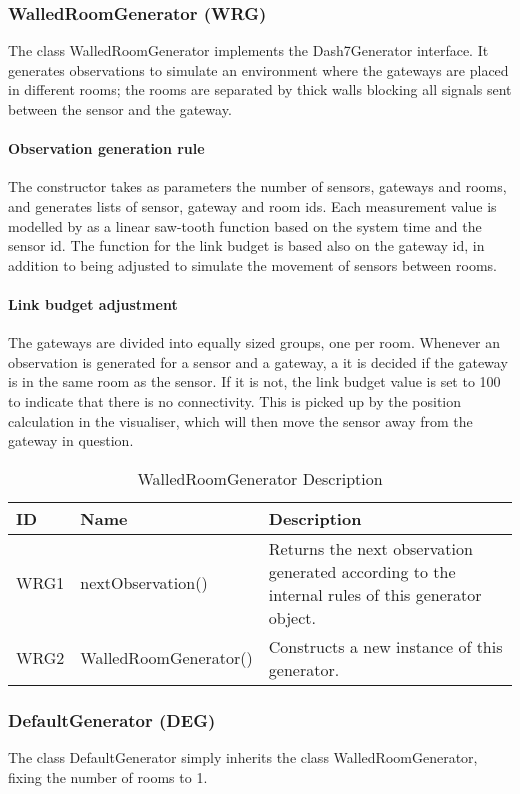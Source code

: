 \documentclass[../document]{subfiles}
\begin{document}
\subsubsection{WalledRoomGenerator (WRG)}
The class WalledRoomGenerator implements the Dash7Generator interface. It generates observations to simulate an environment where the gateways are placed in different rooms; the rooms are separated by thick walls blocking all signals sent between the sensor and the gateway.

\paragraph{Observation generation rule}
The constructor takes as parameters the number of sensors, gateways and rooms, and generates lists of sensor, gateway and room ids. Each measurement value is modelled by as a linear saw-tooth function based on the system time and the sensor id. The function for the link budget is based also on the gateway id, in addition to being adjusted to simulate the movement of sensors between rooms.

\paragraph{Link budget adjustment}
The gateways are divided into equally sized groups, one per room. Whenever an observation is generated for a sensor and a gateway, a it is decided if the gateway is in the same room as the sensor. If it is not, the link budget value is set to 100 to indicate that there is no connectivity. This is picked up by the position calculation in the visualiser, which will then move the sensor away from the gateway in question.

\begin{table}[H]
\caption{WalledRoomGenerator Description}
\centering
\begin{tabularx}{\textwidth}{|L{1.2cm}|L{4cm}|X|}
\hline ID
&Name
&Description
\\ \hline 
WRG1
&nextObservation()
&Returns the next observation generated according to the internal rules of this generator object.
\\ \hline WRG2
&WalledRoomGenerator()
&Constructs a new instance of this generator.
\\ \hline 
\end{tabularx}
\end{table}

\subsubsection{DefaultGenerator (DEG)}
The class DefaultGenerator simply inherits the class WalledRoomGenerator, fixing the number of rooms to 1.
\end{document}
